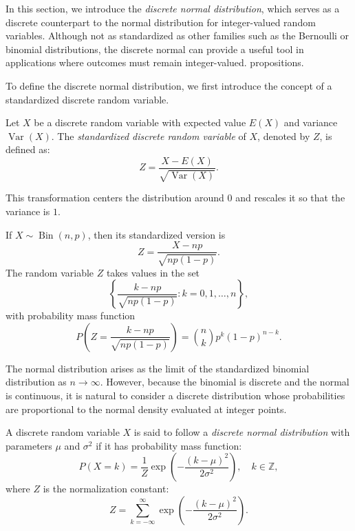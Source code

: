 In this section, we introduce the \emph{discrete normal distribution}, which serves as a discrete counterpart to the normal distribution for integer-valued random variables. Although not as standardized as other families such as the Bernoulli or binomial distributions, the discrete normal can provide a useful tool in applications where outcomes must remain integer-valued. propositions.

To define the discrete normal distribution, we first introduce the concept of a standardized discrete random variable.

\begin{definition}
Let $X$ be a discrete random variable with expected value $E(X)$ and variance $\operatorname{Var}(X)$. The \emph{standardized discrete random variable} of $X$, denoted by $Z$, is defined as:
\[
Z = \frac{X - E(X)}{\sqrt{\operatorname{Var}(X)}}.
\]
\end{definition}

This transformation centers the distribution around $0$ and rescales it so that the variance is $1$.

\begin{example}
If $X \sim \operatorname{Bin}(n,p)$, then its standardized version is
\[
Z = \frac{X - np}{\sqrt{np(1-p)}}.
\]
The random variable $Z$ takes values in the set
\[
\left\{ \frac{k-np}{\sqrt{np(1-p)}} : k = 0,1,\dots,n \right\},
\]
with probability mass function
\[
P\!\left(Z = \frac{k-np}{\sqrt{np(1-p)}}\right) = \binom{n}{k} p^k (1-p)^{n-k}.
\]
\end{example}

The normal distribution arises as the limit of the standardized binomial distribution as $n \to \infty$. However, because the binomial is discrete and the normal is continuous, it is natural to consider a discrete distribution whose probabilities are proportional to the normal density evaluated at integer points.

\begin{definition}
A discrete random variable \( X \) is said to follow a \emph{discrete normal distribution} with parameters \( \mu \) and \( \sigma^2 \) if it has probability mass function:
\[
P(X = k) = \frac{1}{Z} \exp\left( -\frac{(k - \mu)^2}{2\sigma^2} \right), \quad k \in \mathbb{Z},
\]
where \( Z \) is the normalization constant:
\[
Z = \sum_{k = -\infty}^{\infty} \exp\left( -\frac{(k - \mu)^2}{2\sigma^2} \right).
\]
\end{definition}

